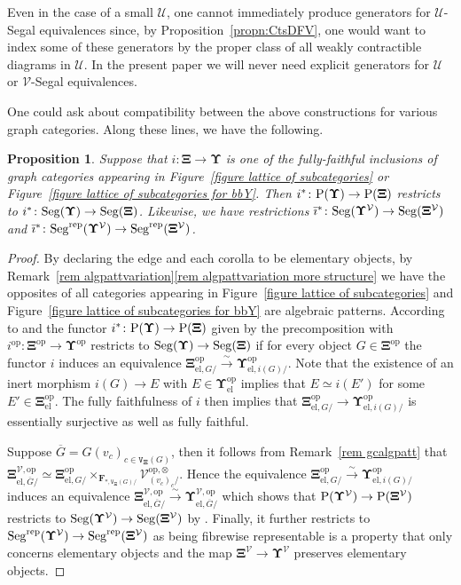 \documentclass{amsart}
\numberwithin{theorem}{subsection}
\newtheorem{proposition}[theorem]{Proposition}
\theoremstyle{definition}
\providecommand{\op}{\mathrm{op}}
\providecommand{\xel}{\mathrm{el}}
\newcommand{\finsetskel}{\mathbf{F}}
\newcommand{\xU}{\mathcal{U}}
\newcommand{\xV}{\mathcal{V}}
\newcommand{\Pre}{\name{P}}
\newcommand{\isoto}{\xrightarrow{\sim}}
\newcommand{\name}[1]{\ensuremath{\text{\textup{#1}}}}
\newcommand{\gc}{\mathbf{\Xi}}
\newcommand{\gcone}{\gc}
\newcommand{\gctwo}{\mathbf{\Upsilon}}
\newcommand{\gcVone}{\gcone^\xV}
\newcommand{\gcVtwo}{\gctwo^\xV}
\newcommand{\bariustar}{\bar \imath^*}
\newcommand{\Seg}{\name{Seg}}
\newcommand{\vertex}{\mathtt{V}}
\newcommand{\Segrep}{\Seg^{\name{rep}}}
\begin{document}
Even in the case of a small $\xU$, one cannot immediately produce generators for $\xU$-Segal equivalences since, by Proposition~\ref{propn:CtsDFV}, one would want to index some of these generators by the proper class of all weakly contractible diagrams in $\xU$.
In the present paper we will never need explicit generators for $\xU$ or $\xV$-Segal equivalences.

One could ask about compatibility between the above constructions for various graph categories.
Along these lines, we have the following.

\begin{proposition}\label{proposition restriction restricts to segal stuff}
Suppose that $i \colon \gcone \to \gctwo$ is one of the fully-faithful inclusions of graph categories appearing in Figure~\ref{figure lattice of subcategories} or Figure~\ref{figure lattice of subcategories for bbY}.
Then $i^* \colon \Pre(\gctwo) \to \Pre(\gcone)$ restricts to $i^* \colon \Seg(\gctwo) \to \Seg(\gcone)$.
Likewise, we have restrictions $\bariustar \colon \Seg(\gcVtwo) \to \Seg(\gcVone)$ and $\bariustar \colon \Segrep(\gcVtwo) \to \Segrep(\gcVone)$.
\end{proposition}
\begin{proof}
	By declaring the edge and each corolla to be elementary objects, by Remark~\ref{rem algpattvariation}\eqref{rem algpattvariation more structure} we have the opposites of all categories appearing in Figure~\ref{figure lattice of subcategories} and Figure~\ref{figure lattice of subcategories for bbY} are algebraic patterns.
	According to \cite[Lemma 4.5]{patterns1} and \cite[Remark 4.4]{patterns1} the functor $i^* \colon \Pre(\gctwo) \to \Pre(\gcone)$ given by the precomposition with $i^\op\colon \gcone^\op \to \gctwo^\op$ restricts to $\Seg(\gctwo) \to \Seg(\gcone)$ if for every object $G\in \gcone^\op$ the functor $i$ induces an equivalence $\gcone_{\xel,G/}^{\op} \isoto \gctwo_{\xel,i(G)/}^{\op}$. 
	Note that the existence of an inert morphism $ i(G)\to E$ with $E\in \gctwo^{\op}_{\xel}$ implies that $E\simeq i(E')$ for some $E'\in \gcone^{\op}_{\xel}$. 
	The fully faithfulness of $i$ then implies that $\gcone_{\xel,G/}^{\op} \to \gctwo_{\xel,i(G)/}^{\op}$ is essentially surjective as well as fully faithful.
	
	Suppose $\overline G = G(v_c)_{c\in \vertex_{\gc}(G)}$, then it follows from Remark~\ref{rem gcalgpatt} that $\gcone_{\xel,\overline G/}^{\xV, \op}\simeq \gcone_{\xel,G/}^{\op}\times_{\finsetskel_{*, \vertex_{\gc}(G)/}} \xV^{\op, \otimes}_{(v_c)_{c}/}$. 
	Hence the equivalence $\gcone_{\xel,G/}^{\op} \isoto \gctwo_{\xel,i(G)/}^{\op}$ induces an equivalence $\gcone_{\xel,\overline G/}^{\xV, \op}\isoto \gctwo_{\xel,\overline G/}^{\xV, \op}$ which shows that $\Pre(\gctwo^\xV) \to \Pre(\gcone^\xV)$ restricts to $\Seg(\gcVtwo) \to \Seg(\gcVone)$ by \cite[Lemma 4.5]{patterns1}. 
	Finally, it further restricts to $\Segrep(\gcVtwo) \to \Segrep(\gcVone)$ as being fibrewise representable is a property that only concerns elementary objects and the map $\gcVone\to \gcVtwo$ preserves elementary objects.
\end{proof}
\end{document}
